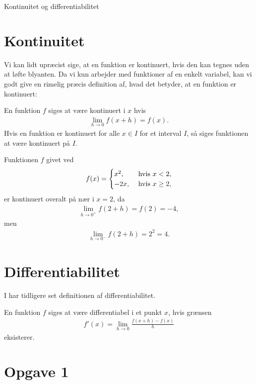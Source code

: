 \begin{center}
\Huge
Kontinuitet og differentiabilitet
\end{center}
\section*{Kontinuitet}

Vi kan lidt upræcist sige, at en funktion er kontinuert, hvis den kan tegnes uden at løfte blyanten. Da vi kun arbejder med funktioner af en enkelt variabel, kan vi godt give en rimelig præcis definition af, hvad det betyder, at en funktion er kontinuert:
\begin{defn}
En funktion $f$ siges at være kontinuert i $x$ hvis 
\begin{align*}
\lim_{h\to 0}f(x+h) = f(x).
\end{align*}
Hvis en funktion er kontinuert for alle $x\in I$ for et interval $I$, så siges funktionen at være kontinuert på $I$. 
\end{defn}
\begin{exa}
Funktionen $f$ givet ved 
\begin{align*}
f(x) = \begin{cases}
x^2,\ &\textnormal{hvis }x<2,\\
-2x,\ &\textnormal{hvis }x\geq 2,
\end{cases}
\end{align*}
er kontinuert overalt på nær i $x=2$, da 
\begin{align*}
\lim_{h\to 0^+}f(2+h) = f(2) = -4,
\end{align*}
men
\begin{align*}
\lim_{h\to 0^-} f(2+h) = 2^2 = 4.
\end{align*}
\end{exa}
\section*{Differentiabilitet}
I har tidligere set definitionen af differentiabilitet.
\begin{defn}
En funktion $f$ siges at være differentiabel i et punkt $x$, hvis grænsen 
\begin{align*}
f'(x) = \lim_{h \to 0} \frac{f(x+h)-f(x)}{h}
\end{align*}
eksisterer. 

\end{defn}

\section*{Opgave 1}

